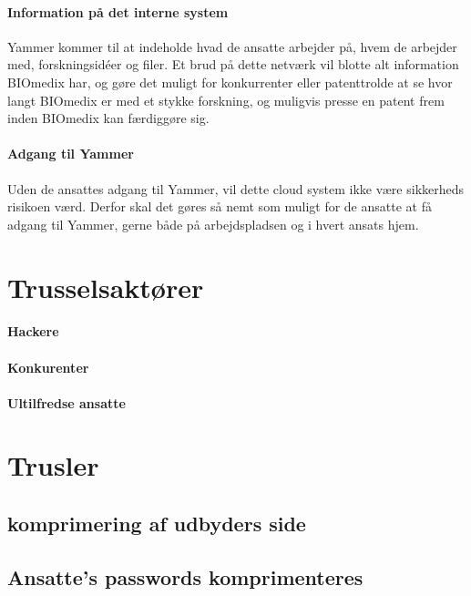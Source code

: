 \documentclass{article}
\begin{document}
\paragraph{Information på det interne system}
Yammer kommer til at indeholde hvad de ansatte arbejder på, hvem de arbejder med, forskningsidéer og filer. Et brud på dette netværk vil blotte alt information BIOmedix har, og gøre det muligt for konkurrenter eller patenttrolde at se hvor langt BIOmedix er med et stykke forskning, og muligvis presse en patent frem inden BIOmedix kan færdiggøre sig. 

\paragraph{Adgang til Yammer}
Uden de ansattes adgang til Yammer, vil dette cloud system ikke være sikkerheds risikoen værd. Derfor skal det gøres så nemt som muligt for de ansatte at få adgang til Yammer, gerne både på arbejdspladsen og i hvert ansats hjem.  


\section{Trusselsaktører}

\paragraph{Hackere}

\paragraph{Konkurenter}

\paragraph{Ultilfredse ansatte}

\section{Trusler}

\subsection{komprimering af udbyders side}

\subsection{Ansatte's passwords komprimenteres}
\end{document}
